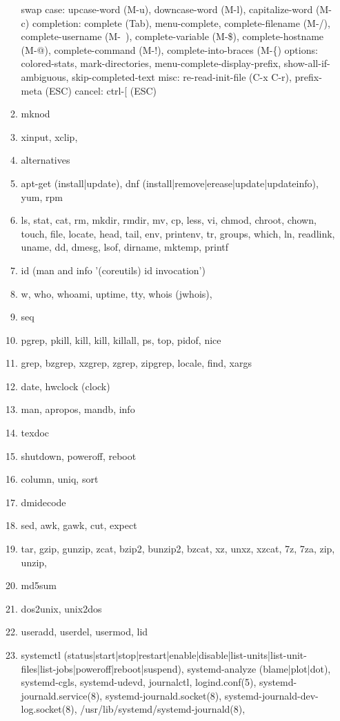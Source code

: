 \documentclass{article}
\begin{document}
\begin{enumerate}
\begin{enumerate}
                swap case: upcase-word (M-u), downcase-word (M-l), capitalize-word (M-c)
                completion: complete (Tab), menu-complete, complete-filename (M-/), complete-username (M-~), complete-variable (M-\$), complete-hostname (M-@), complete-command (M-!), complete-into-braces (M-\{)
                options: colored-stats, mark-directories, menu-complete-display-prefix,
                         show-all-if-ambiguous, skip-completed-text
                misc: re-read-init-file (C-x C-r), prefix-meta (ESC)
                cancel: ctrl-[ (ESC)
            \item mknod
            \item xinput, xclip,
            \item alternatives
            \item apt-get (install|update), dnf (install|remove|erease|update|updateinfo), yum, rpm
            \item ls, stat, cat, rm, mkdir, rmdir, mv, cp, less, vi, chmod, chroot, chown, touch, file, locate, head, tail, env, printenv, tr, groups, which, ln, readlink, uname, dd, dmesg, lsof, dirname, mktemp, printf
            \item id (man and info '(coreutils) id invocation')
            \item w, who, whoami, uptime, tty, whois (jwhois),
            \item seq
            \item pgrep, pkill, kill, kill, killall, ps, top, pidof, nice
            \item grep, bzgrep, xzgrep, zgrep, zipgrep, locale, find, xargs
            \item date, hwclock (clock)
            \item man, apropos, mandb, info
            \item texdoc
            \item shutdown, poweroff, reboot
            \item column, uniq, sort
            \item dmidecode
            \item sed, awk, gawk, cut, expect
            \item tar, gzip, gunzip, zcat, bzip2, bunzip2, bzcat, xz, unxz, xzcat, 7z, 7za, zip, unzip,
            \item md5sum
            \item dos2unix, unix2dos
            \item useradd, userdel, usermod, lid
            \item systemctl (status|start|stop|restart|enable|disable|list-units|list-unit-files|list-jobs|poweroff|reboot|suspend), systemd-analyze (blame|plot|dot), systemd-cgls, systemd-udevd, journalctl, logind.conf(5), systemd-journald.service(8), systemd-journald.socket(8), systemd-journald-dev-log.socket(8), /usr/lib/systemd/systemd-journald(8),

\end{enumerate}
\end{enumerate}
\end{document}
